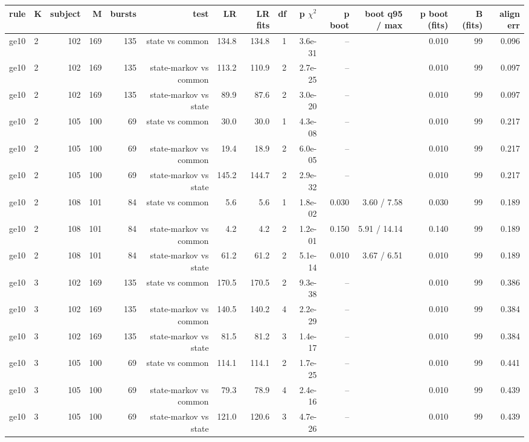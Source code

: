 \begin{table}[ht]
\centering
\small
\begin{tabular}{llrrrrrrrrrrrrr}
\toprule
rule & K & subject & M & bursts & test & LR & LR fits & df & p $\chi^2$ & p boot & boot q95 / max & p boot (fits) & B (fits) & align err \\
\midrule
ge10 & 2 & 102 & 169 & 135 & state vs common & 134.8 & 134.8 & 1 & 3.6e-31 & -- &  & 0.010 & 99 & 0.096 \\
ge10 & 2 & 102 & 169 & 135 & state-markov vs common & 113.2 & 110.9 & 2 & 2.7e-25 & -- &  & 0.010 & 99 & 0.097 \\
ge10 & 2 & 102 & 169 & 135 & state-markov vs state & 89.9 & 87.6 & 2 & 3.0e-20 & -- &  & 0.010 & 99 & 0.097 \\
ge10 & 2 & 105 & 100 & 69 & state vs common & 30.0 & 30.0 & 1 & 4.3e-08 & -- &  & 0.010 & 99 & 0.217 \\
ge10 & 2 & 105 & 100 & 69 & state-markov vs common & 19.4 & 18.9 & 2 & 6.0e-05 & -- &  & 0.010 & 99 & 0.217 \\
ge10 & 2 & 105 & 100 & 69 & state-markov vs state & 145.2 & 144.7 & 2 & 2.9e-32 & -- &  & 0.010 & 99 & 0.217 \\
ge10 & 2 & 108 & 101 & 84 & state vs common & 5.6 & 5.6 & 1 & 1.8e-02 & 0.030 & 3.60 / 7.58 & 0.030 & 99 & 0.189 \\
ge10 & 2 & 108 & 101 & 84 & state-markov vs common & 4.2 & 4.2 & 2 & 1.2e-01 & 0.150 & 5.91 / 14.14 & 0.140 & 99 & 0.189 \\
ge10 & 2 & 108 & 101 & 84 & state-markov vs state & 61.2 & 61.2 & 2 & 5.1e-14 & 0.010 & 3.67 / 6.51 & 0.010 & 99 & 0.189 \\
ge10 & 3 & 102 & 169 & 135 & state vs common & 170.5 & 170.5 & 2 & 9.3e-38 & -- &  & 0.010 & 99 & 0.386 \\
ge10 & 3 & 102 & 169 & 135 & state-markov vs common & 140.5 & 140.2 & 4 & 2.2e-29 & -- &  & 0.010 & 99 & 0.384 \\
ge10 & 3 & 102 & 169 & 135 & state-markov vs state & 81.5 & 81.2 & 3 & 1.4e-17 & -- &  & 0.010 & 99 & 0.384 \\
ge10 & 3 & 105 & 100 & 69 & state vs common & 114.1 & 114.1 & 2 & 1.7e-25 & -- &  & 0.010 & 99 & 0.441 \\
ge10 & 3 & 105 & 100 & 69 & state-markov vs common & 79.3 & 78.9 & 4 & 2.4e-16 & -- &  & 0.010 & 99 & 0.439 \\
ge10 & 3 & 105 & 100 & 69 & state-markov vs state & 121.0 & 120.6 & 3 & 4.7e-26 & -- &  & 0.010 & 99 & 0.439 \\

\end{tabular}
\end{table}
